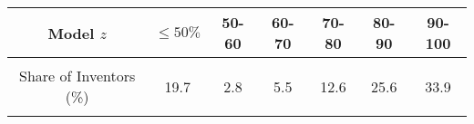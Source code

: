 \documentclass{beamer}
\begin{document}
{  \begin{table}[t]
    \begin{center}\footnotesize
      \begin{tabular}{cccccccc
        }
        \hline\hline
        \multicolumn{2}{c}{Model $z$}                & $\leq50\%$ & 50-60 & 60-70 & 70-80 & 80-90 & 90-100   \\\hline
                                                     &            &       &       &       &       &        & \\
        \multicolumn{2}{c}{Share of Inventors (\%) } & 19.7       & 2.8   & 5.5   & 12.6  & 25.6  & 33.9     \\
        \\\hline
      \end{tabular}
    \end{center}
  \end{table}
}
\end{document}
